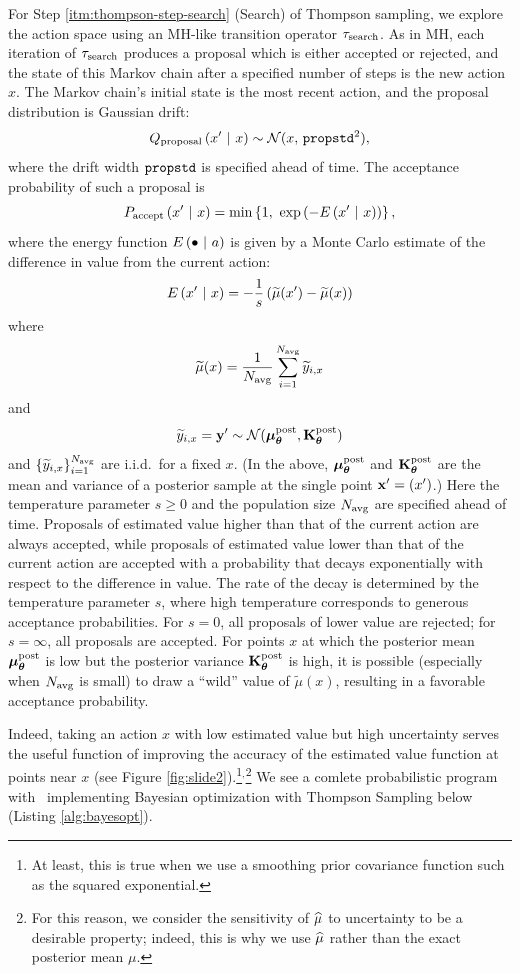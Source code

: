 For Step \ref{itm:thompson-step-search} (Search) of Thompson sampling, we
explore the action space using an MH-like transition operator $\tau_{\textrm{search}}$.
As in MH, each iteration of $\tau_{\textrm{search}}$ produces a proposal which is either
accepted or rejected, and the state of this Markov chain after a specified
number of steps is the new action $x$.  The Markov chain's initial state is the
most recent action, and the proposal distribution is Gaussian drift:
\[ Q_{\textrm{proposal}}\left( x' \ \middle\vert\  x \right) \sim \mathcal{N}(x,\,\texttt{propstd}^2), \]
where the drift width $\texttt{propstd}$ is specified ahead of time.  The acceptance
probability of such a proposal is
\[ P_\accept\pn{x' \mvert x} = \min\br{1,\ \exp\pn{-E\pn{x' \mvert x}}}, \]
where the energy function $E\left( \bullet \ \middle\vert\  a \right)$ is given by a Monte Carlo
estimate of the difference in value from the current action:
\[ E\left( x' \ \middle\vert\  x \right) = -\frac1s \left( \widetilde{\mu}(x') - \widetilde{\mu}(x) \right) \]
where
\[ \widetilde{\mu}(x) = \frac{1}{N_{\textrm{avg}}} \sum_{i=1}^{N_{\textrm{avg}}} \widetilde{y}_{i,x} \]
and
\[ \widetilde{y}_{i,x}=\mathbf{y}^\prime \sim \mathcal{N}(\bm{\mu}_{\bm{\theta}}^\text{post}, \mathbf{K}_{\bm{\theta}}^\text{post}) \]
and $\left\{ \widetilde{y}_{i,x} \right\}_{i=1}^{N_{\textrm{avg}}}$ are i.i.d.\ for a fixed $x$.
(In the above, $\bm{\mu}_{\bm{\theta}}^\text{post}$ and $\mathbf{K}_{\bm{\theta}}^\text{post}$ are the mean and variance of a posterior
sample at the single point $\mathbf{x}^\prime = (x^\prime)$.)
Here the temperature parameter $s \geq 0$ and the population size $N_{\textrm{avg}}$ are
specified ahead of time.  Proposals of estimated value higher than that of the current action are
always accepted, while proposals of estimated value lower than that of the
current action are accepted with a probability that decays exponentially
with respect to the difference in value.
The rate of the decay is determined by the temperature parameter $s$,
where high temperature corresponds to generous acceptance probabilities.
For $s=0$, all proposals of lower value are rejected; for $s=\infty$, all
proposals are accepted.
For points $x$ at which the posterior mean $\bm{\mu}_{\bm{\theta}}^\text{post}$ is low but the
posterior variance $\mathbf{K}_{\bm{\theta}}^\text{post}$ is high, it is possible (especially when
$N_{\textrm{avg}}$ is small) to draw a ``wild'' value of $\widetilde{\mu}(x)$, resulting in a
favorable acceptance probability.



Indeed, taking an action $x$ with low estimated value but high uncertainty
serves the useful function of improving the accuracy of the estimated value
function at points near $x$ (see Figure \ref{fig:slide2}).\footnote{
  At least, this is true when we use a smoothing prior covariance function such
  as the squared exponential.
}$^,$\footnote{
  For this reason, we consider the sensitivity of $\widehat{\mu}$ to uncertainty to be
  a desirable property; indeed, this is why we use $\widehat{\mu}$ rather than the
  exact posterior mean $\mu$.
}
We see a comlete probabilistic program with \gpmem\ implementing Bayesian optimization
with Thompson Sampling below (Listing \ref{alg:bayesopt}).
 


